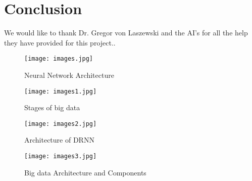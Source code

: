 \documentclass[sigconf]{acmart}
\begin{document}
\section{Conclusion}

\begin{acks}
We would like to thank Dr. Gregor von Laszewski and the AI's for all the help they have provided for this project..
\end{acks}

\appendix



 

\begin{figure}[htp]
    \texttt{[image: images.jpg]}
    \caption{Neural Network Architecture \cite{google}}
    \label{fig:figure1}
\end{figure}

\begin{figure}[htp]
    \texttt{[image: images1.jpg]}
    \caption{Stages of big data}
    \label{fig:figure2}
\end{figure}

\begin{figure}[htp]
    \texttt{[image: images2.jpg]}
    \caption{Architecture of DRNN}
    \label{fig:figure3}
\end{figure}

\begin{figure}[htp]
    \texttt{[image: images3.jpg]}
    \caption{Big data Architecture and Components \cite{www-google}}
    \label{fig:figure4}
\end{figure}
\end{document}
